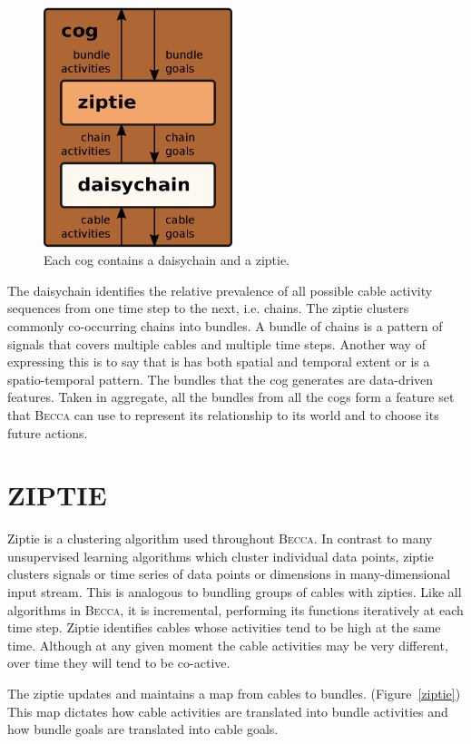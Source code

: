 \documentclass[oneside,twocolumn]{article}
\begin{document}
\begin{figure}[ht]
\centering
\includegraphics[height=7.0cm]{figs/cog.png}
\caption{Each cog contains a daisychain and a ziptie.}
\label{cog}
\end{figure}

The daisychain identifies the relative prevalence of all possible cable activity sequences from one time step to the next, i.e. chains. The ziptie clusters commonly co-occurring chains into bundles. A bundle of chains is a pattern of signals that covers multiple cables and multiple time steps. Another way of expressing this is to say that is has both spatial and temporal extent or is a spatio-temporal pattern. The bundles that the cog generates are data-driven features. Taken in aggregate, all the bundles from all the cogs form a feature set that \textsc{Becca} can use to represent its relationship to its world and to choose its future actions. 

\section*{\color{copper} ZIPTIE}

Ziptie is a clustering algorithm used throughout \textsc{Becca}. In contrast to many unsupervised learning algorithms which cluster individual data points, ziptie clusters signals or time series of data points or dimensions in many-dimensional input stream. This is analogous to bundling groups of cables with zipties. Like all algorithms in \textsc{Becca}, it is incremental, performing its functions iteratively at each time step. Ziptie identifies cables whose activities tend to be high at the same time. Although at any given moment the cable activities may be very different, over time they will tend to be co-active. 

The ziptie updates and maintains a map from cables to bundles. (Figure~\ref{ziptie}) This map dictates how cable activities are translated into bundle activities and how bundle goals are translated into cable goals. 
\end{document}
